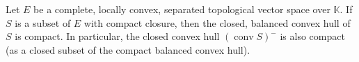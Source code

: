Let $E$ be a complete, locally convex, separated topological vector space over $\mathbb{K}$. If $S$ is a subset of $E$ with compact closure, then the closed, balanced convex hull of $S$ is compact. In particular, the closed convex hull $(\operatorname{conv} S)^-$ is also compact (as a closed subset of the compact balanced convex hull).
